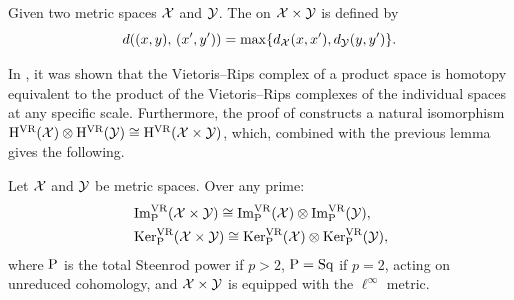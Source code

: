 \subsubsection{}\label{ss:products}

Given two metric spaces $\mathcal{X}$ and $\mathcal{Y}$.
The  on $\mathcal{X} \times \mathcal{Y}$ is defined by
\[
d((x,y), \, (x',y')) = \max\{d_{\mathcal{X}}(x,x'), d_{\mathcal{Y}}(y,y')\}.
\]

In \cite[Proposition~10.2]{adamaszek2017VietorisProduct}, it was shown that the Vietoris--Rips complex of a product space is homotopy equivalent to the product of the Vietoris--Rips complexes of the individual spaces at any specific scale.
Furthermore, the proof of \cite[Theorem~6.1(1)]{lim2024vietoris} constructs a natural isomorphism $\mathrm{H}^{\mathrm{VR}}(\mathcal{X}) \otimes \mathrm{H}^{\mathrm{VR}}(\mathcal{Y}) \cong \mathrm{H}^{\mathrm{VR}}(\mathcal{X} \times \mathcal{Y})$, which, combined with the previous lemma gives the following.

\theorem
Let $\mathcal{X}$ and $\mathcal{Y}$ be metric spaces.
Over any prime:
\begin{align*}
	&\operatorname{Im}^{\mathrm{VR}}_{\mathrm{P}}(\mathcal{X} \times \mathcal{Y}) \cong \operatorname{Im}^{\mathrm{VR}}_{\mathrm{P}}(\mathcal{X}) \otimes \operatorname{Im}^{\mathrm{VR}}_{\mathrm{P}}(\mathcal{Y}), \\
	&\operatorname{Ker}^{\mathrm{VR}}_{\mathrm{P}}(\mathcal{X} \times \mathcal{Y}) \cong \operatorname{Ker}^{\mathrm{VR}}_{\mathrm{P}}(\mathcal{X}) \otimes \operatorname{Ker}^{\mathrm{VR}}_{\mathrm{P}}(\mathcal{Y}),
\end{align*}
where \(\mathrm{P}\) is the total Steenrod power if \(p > 2\), \(\mathrm{P} = \mathrm{Sq}\) if \(p = 2\), acting on unreduced cohomology, and \(\mathcal{X} \times \mathcal{Y}\) is equipped with the \(\ell^\infty\) metric.
